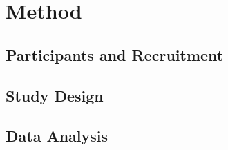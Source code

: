 \section{Method}
\subsection{Participants and Recruitment}

\subsection{Study Design}

\subsection{Data Analysis}

